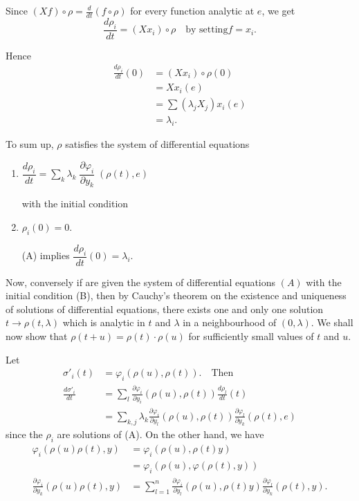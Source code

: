 Since $(Xf)\circ \rho = \frac{d}{dt}(f\circ \rho)$ for every function
analytic at $e$, we get 
$$
\frac{d \rho_i}{dt}=(X x_i)\circ \rho\quad\text{by setting} f = x_i.
$$

Hence 
\begin{align*}
\frac{d \rho_i}{dt}(0) & = (X x_i) \circ \rho (0)\\
& = X x_i (e)\\
& = \sum (\lambda_j X_j ) x_i(e)\\
&=\lambda_i.
\end{align*}

To sum up, $\rho$ satisfies the system of differential equations
\begin{enumerate}
\renewcommand{\theenumi}{\Alph{enumi}}
\renewcommand{\labelenumi}{(\theenumi)}
\item  $\dfrac{d \rho_i}{dt} = \sum_{k} \lambda_k  \;  \dfrac{\partial
  \varphi_i}{\partial y_k} \; (\rho (t), e)$ 
 
with the initial condition

\item $\rho_i(0)=0$.

(A) implies  $\dfrac{d \rho_i}{dt}(0)=\lambda_i$.
\end{enumerate}

Now, conversely if are given the system of differential equations
$(A)$ with the initial condition (B), then by Cauchy's theorem on
the existence and uniqueness of solutions of differential equations,
there exists one and only one solution $t \rightarrow \rho (t,
\lambda)$ which is analytic in $t$ and $\lambda$ in a neighbourhood of
$(0, \lambda)$. We shall now show that $\rho(t+u)= \rho(t)\cdot\rho(u)$
for sufficiently small values of $t$ and $u$. 

Let\pageoriginale
\begin{align*}
\sigma'_i(t) & =\varphi_i(\rho (u),\rho (t)).\quad \text{Then}\\
\frac{d \sigma'_i} {dt} &= \sum_{l} \frac{\partial
  \varphi_i}{\partial y_i}(\rho (u),\rho (t))\frac{d \rho_l}{dt}(t)\\ 
& = \sum_{k,j} \lambda_k \frac{\partial \varphi_i}{\partial
  y_l}(\rho (u),\rho (t)) \frac{\partial \varphi_l}{\partial y_k}(\rho
(t),e) 
\end{align*}
since the $\rho_i$ are solutions of (A). On the other hand, we have
\begin{align*}
\varphi_i(\rho (u)\rho (t),y) & = \varphi_i (\rho (u),\rho (t) y)\\
&= \varphi_i(\rho (u),\varphi(\rho (t),y))\\
\frac{\partial \varphi_i}{\partial y_k} (\rho (u)\rho (t), y) & =
\sum\limits^{n}_{l=1} \frac{\partial \varphi_i}{\partial y_l}(\rho
(u),\rho (t)y) \frac{\partial \varphi_l}{\partial y_k}(\rho (t),y). 
\end{align*}

